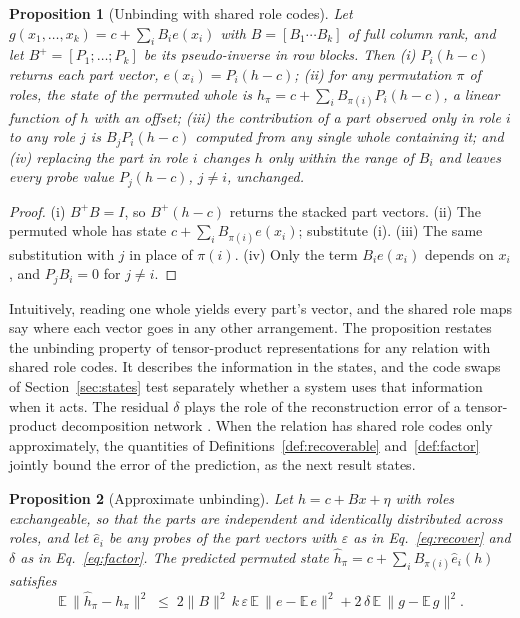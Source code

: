 \documentclass[10pt]{article}
\theoremstyle{plain}
\newtheorem{proposition}{Proposition}
\theoremstyle{remark}
\begin{document}
\noindent

\begin{proposition}[Unbinding with shared role codes]
\label{prop:systematic}
Let $g(x_1, \ldots, x_k) = c + \sum_i B_i e(x_i)$ with $B = [B_1 \cdots B_k]$ of full column rank, and let $B^{+} = [P_1; \ldots; P_k]$ be its pseudo-inverse in row blocks. Then (i) $P_i(h - c)$ returns each part vector, $e(x_i) = P_i(h - c)$; (ii) for any permutation $\pi$ of roles, the state of the permuted whole is $h_\pi = c + \sum_i B_{\pi(i)} P_i (h - c)$, a linear function of $h$ with an offset; (iii) the contribution of a part observed only in role $i$ to any role $j$ is $B_j P_i (h - c)$ computed from any single whole containing it; and (iv) replacing the part in role $i$ changes $h$ only within the range of $B_i$ and leaves every probe value $P_j(h - c)$, $j \ne i$, unchanged.
\end{proposition}

\begin{proof}
(i) $B^{+}B = I$, so $B^{+}(h - c)$ returns the stacked part vectors. (ii) The permuted whole has state $c + \sum_i B_{\pi(i)} e(x_i)$; substitute (i). (iii) The same substitution with $j$ in place of $\pi(i)$. (iv) Only the term $B_i e(x_i)$ depends on $x_i$, and $P_j B_i = 0$ for $j \neq i$.
\end{proof}

\noindent
Intuitively, reading one whole yields every part's vector, and the shared role maps say where each vector goes in any other arrangement. The proposition restates the unbinding property of tensor-product representations \citep{smolensky1990} for any relation with shared role codes. It describes the information in the states, and the code swaps of Section~\ref{sec:states} test separately whether a system uses that information when it acts. The residual $\delta$ plays the role of the reconstruction error of a tensor-product decomposition network \citep{mccoy2019}. When the relation has shared role codes only approximately, the quantities of Definitions~\ref{def:recoverable} and~\ref{def:factor} jointly bound the error of the prediction, as the next result states.

\begin{proposition}[Approximate unbinding]
\label{prop:approx}
Let $h = c + Bx + \eta$ with roles exchangeable, so that the parts are independent and identically distributed across roles, and let $\hat{e}_i$ be any probes of the part vectors with $\varepsilon$ as in Eq.~\eqref{eq:recover} and $\delta$ as in Eq.~\eqref{eq:factor}. The predicted permuted state $\hat{h}_\pi = c + \sum_i B_{\pi(i)}\hat{e}_i(h)$ satisfies
\begin{equation}
  \mathbb{E}\,\lVert \hat{h}_\pi - h_\pi \rVert^2 \;\le\; 2\lVert B \rVert^2\, k\,\varepsilon\, \mathbb{E}\,\lVert e - \mathbb{E}\,e \rVert^2 + 2\,\delta\, \mathbb{E}\,\lVert g - \mathbb{E}\,g \rVert^2 .
\end{equation}
\end{proposition}
\end{document}
